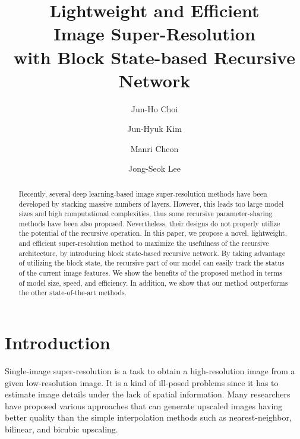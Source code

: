 \documentclass[runningheads]{llncs}
\begin{document}
\title{Lightweight and Efficient\\Image Super-Resolution\\with Block State-based Recursive Network} 

\author{Jun-Ho Choi \and Jun-Hyuk Kim \and Manri Cheon \and Jong-Seok Lee}

\maketitle              \begin{abstract}
Recently, several deep learning-based image super-resolution methods have been developed by stacking massive numbers of layers.
However, this leads too large model sizes and high computational complexities, thus some recursive parameter-sharing methods have been also proposed.
Nevertheless, their designs do not properly utilize the potential of the recursive operation.
In this paper, we propose a novel, lightweight, and efficient super-resolution method to maximize the usefulness of the recursive architecture, by introducing block state-based recursive network.
By taking advantage of utilizing the block state, the recursive part of our model can easily track the status of the current image features.
We show the benefits of the proposed method in terms of model size, speed, and efficiency.
In addition, we show that our method outperforms the other state-of-the-art methods.

\end{abstract}
\section{Introduction}

Single-image super-resolution is a task to obtain a high-resolution image from a given low-resolution image.
It is a kind of ill-posed problems since it has to estimate image details under the lack of spatial information.
Many researchers have proposed various approaches that can generate upscaled images having better quality than the simple interpolation methods such as nearest-neighbor, bilinear, and bicubic upscaling.
\end{document}
